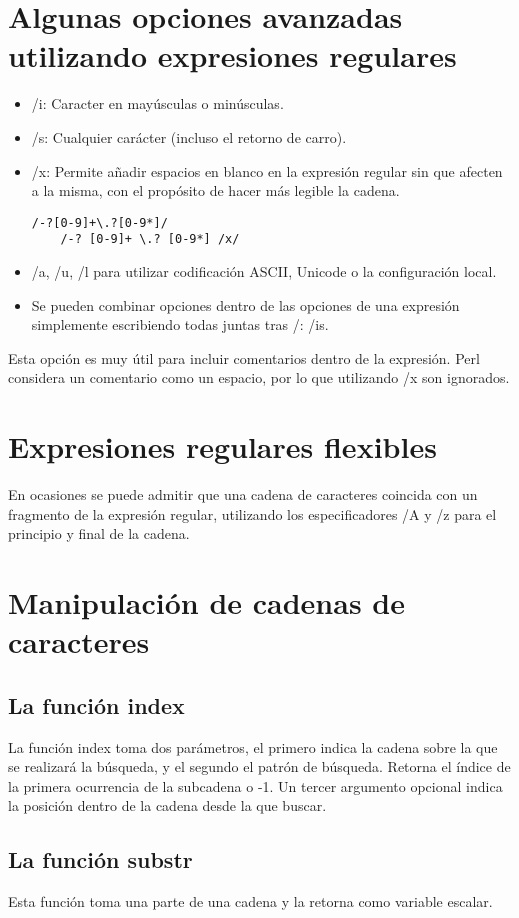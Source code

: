 \documentclass[12pt,a4paper]{memoir} %
\begin{document}
	\section{Algunas opciones avanzadas utilizando expresiones regulares}
	\begin{itemize}
	\item /i: Caracter en mayúsculas o minúsculas.
	\item /s: Cualquier carácter (incluso el retorno de carro).
	\item /x: Permite añadir espacios en blanco en la expresión regular sin que afecten a la misma, con el propósito de hacer más legible la cadena.
	\lstset{language=Perl, showspaces=false}
	\begin{lstlisting}[frame=single, showspaces=false]
	/-?[0-9]+\.?[0-9*]/
	/-? [0-9]+ \.? [0-9*] /x/
	\end{lstlisting}
	\item /a, /u, /l para utilizar codificación ASCII, Unicode o la configuración local.
	\item Se pueden combinar opciones dentro de las opciones de una expresión simplemente escribiendo todas juntas tras /: /is.
	\end{itemize}
	Esta opción es muy útil para incluir comentarios dentro de la expresión. Perl considera un comentario como un espacio, por lo que utilizando /x son ignorados.
	\section{Expresiones regulares flexibles}
	En ocasiones se puede admitir que una cadena de caracteres coincida con un fragmento de la expresión regular, utilizando los especificadores /A y /z para el principio y final de la cadena.
	\section{Manipulación de cadenas de caracteres}
	\subsection{La función index}
	La función index toma dos parámetros, el primero indica la cadena sobre la que se realizará la búsqueda, y el segundo el patrón de búsqueda. Retorna el índice de la primera ocurrencia de la subcadena o -1. Un tercer argumento opcional indica la posición dentro de la cadena desde la que buscar.
	\subsection{La función substr}
	Esta función toma una parte de una cadena y la retorna como variable escalar.
\end{document}
